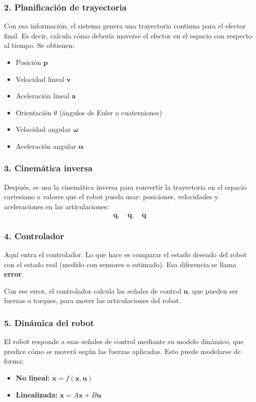 \subsubsection{2. Planificación de trayectoria}

Con esa información, el sistema genera una trayectoria continua para el efector final. Es decir, calcula cómo debería moverse el efector en el espacio con respecto al tiempo. Se obtienen:
\begin{itemize}
	\item Posición \( \mathbf{p} \)
	\item Velocidad lineal \( \mathbf{v} \)
	\item Aceleración lineal \( \mathbf{a} \)
	\item Orientación \( \theta \) (ángulos de Euler o cuaterniones)
	\item Velocidad angular \( \boldsymbol{\omega} \)
	\item Aceleración angular \( \boldsymbol{\alpha} \)
\end{itemize}

\subsubsection{3. Cinemática inversa}

Después, se usa la cinemática inversa para convertir la trayectoria en el espacio cartesiano a valores que el robot pueda usar: posiciones, velocidades y aceleraciones en las articulaciones:
\[
\mathbf{q}, \quad \dot{\mathbf{q}}, \quad \ddot{\mathbf{q}}
\]

\subsubsection{4. Controlador}

Aquí entra el controlador. Lo que hace es comparar el estado deseado del robot con el estado real (medido con sensores o estimado). Esa diferencia se llama \textbf{error}.

Con ese error, el controlador calcula las señales de control \( \mathbf{u} \), que pueden ser fuerzas o torques, para mover las articulaciones del robot.

\subsubsection{5. Dinámica del robot}

El robot responde a esas señales de control mediante su modelo dinámico, que predice cómo se moverá según las fuerzas aplicadas. Esto puede modelarse de forma:
\begin{itemize}
	\item \textbf{No lineal:} \( \dot{\mathbf{x}} = f(\mathbf{x}, \mathbf{u}) \)
	\item \textbf{Linealizada:} \( \dot{\mathbf{x}} = A\mathbf{x} + B\mathbf{u} \)
\end{itemize}


